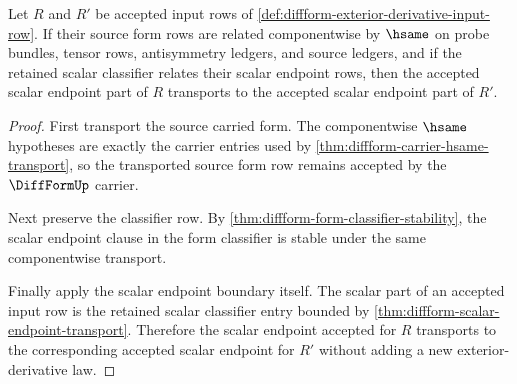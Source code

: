 \begin{theorem}
\label{thm:diffform-exterior-derivative-scalar-transport-boundary}
Let $R$ and $R'$ be accepted input rows of
\autoref{def:diffform-exterior-derivative-input-row}. If their source form rows
are related componentwise by $\hsame$ on probe bundles, tensor rows,
antisymmetry ledgers, and source ledgers, and if the retained scalar classifier
relates their scalar endpoint rows, then the accepted scalar endpoint part of
$R$ transports to the accepted scalar endpoint part of $R'$.
\end{theorem}
\begin{proof}
First transport the source carried form. The componentwise $\hsame$ hypotheses
are exactly the carrier entries used by
\autoref{thm:diffform-carrier-hsame-transport}, so the transported source form
row remains accepted by the $\DiffFormUp$ carrier.

Next preserve the classifier row. By
\autoref{thm:diffform-form-classifier-stability}, the scalar endpoint clause in
the form classifier is stable under the same componentwise transport.

Finally apply the scalar endpoint boundary itself. The scalar part of an
accepted input row is the retained scalar classifier entry bounded by
\autoref{thm:diffform-scalar-endpoint-transport}. Therefore the scalar endpoint
accepted for $R$ transports to the corresponding accepted scalar endpoint for
$R'$ without adding a new exterior-derivative law.
\end{proof}

